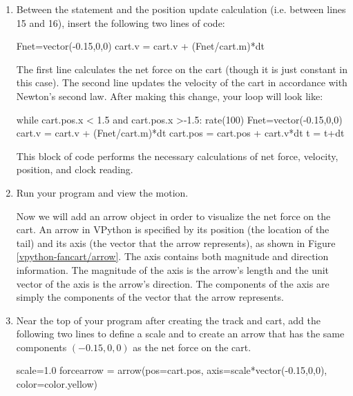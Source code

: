 \begin{enumerate}
\item Between the  statement and the position update calculation (i.e. between lines 15 and 16), insert the following two lines of code:

\begin{myvpython}
	Fnet=vector(-0.15,0,0)
	cart.v = cart.v + (Fnet/cart.m)*dt
\end{myvpython}

The first line calculates the net force on the cart (though it is just constant in this case). The second line updates the velocity of the cart in accordance with Newton's second law. After making this change, your  loop will look like:

\begin{vpythonblock}
while cart.pos.x < 1.5 and cart.pos.x >-1.5:
	rate(100)
	Fnet=vector(-0.15,0,0)
	cart.v = cart.v + (Fnet/cart.m)*dt
	cart.pos = cart.pos + cart.v*dt
	t = t+dt
\end{vpythonblock}

This block of code performs the necessary calculations of net force, velocity, position, and clock reading.

\item Run your program and view the motion.


Now we will add an arrow object in order to visualize the net force on the cart.  An arrow in VPython is specified by its position (the location of the tail) and its axis (the vector that the arrow represents), as shown in Figure \ref{vpython-fancart/arrow}. The axis contains both magnitude and direction information. The magnitude of the axis is the arrow's length and the unit vector of the axis is the arrow's direction. The components of the axis are simply the components of the vector that the arrow represents.


\item Near the top of your program after creating the track and cart, add the following two lines to define a scale and to create an arrow that has the same components $(-0.15,0,0)$ as the net force on the cart.

\begin{myvpython}
scale=1.0
forcearrow = arrow(pos=cart.pos, axis=scale*vector(-0.15,0,0), color=color.yellow)
\end{myvpython}


\end{enumerate}
